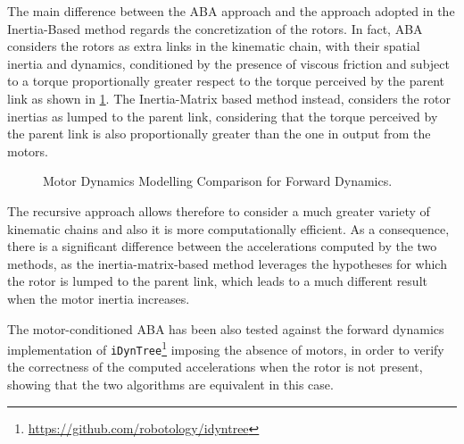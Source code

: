 The main difference between the \ac{ABA} approach and the approach adopted in the Inertia-Based method regards the concretization of the rotors. In fact, \ac{ABA} considers the rotors as extra links in the kinematic chain, with their spatial inertia and dynamics, conditioned by the presence of viscous friction and subject to a torque proportionally greater respect to the torque perceived by the parent link as shown in \cref{fig:ABA_comparison}. The Inertia-Matrix based method instead, considers the rotor inertias as lumped to the parent link, considering that the torque perceived by the parent link is also proportionally greater than the one in output from the motors.

\begin{figure}
    \centering
    \caption{Motor Dynamics Modelling Comparison for Forward Dynamics.}
    \label{fig:ABA_comparison}
    \subfloat[ABA]{
        \resizebox{0.5\textwidth}{!}{
            
        }}
\end{figure}

The recursive approach allows therefore to consider a much greater variety of kinematic chains and also it is more computationally efficient. As a consequence, there is a significant difference between the accelerations computed by the two methods, as the inertia-matrix-based method leverages the hypotheses for which the rotor is lumped to the parent link, which leads to a much different result when the motor inertia increases.

The motor-conditioned \ac{ABA} has been also tested against the forward dynamics implementation of \texttt{iDynTree}\footnote{\url{https://github.com/robotology/idyntree}} \citep{10.3389/frobt.2015.00006} imposing the absence of motors, in order to verify the correctness of the computed accelerations when the rotor is not present, showing that the two algorithms are equivalent in this case.
